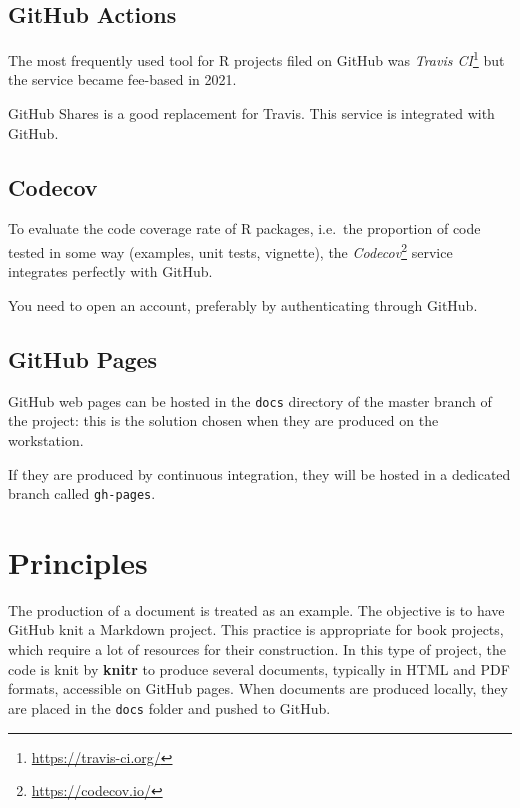 \documentclass[
  12pt,
  american,
  a4paper,
  extrafontsizes,onecolumn,openright
  ]{memoir}
\newlength{\rf}
\begin{document}
\hypertarget{github-actions}{%
\subsection{GitHub Actions}\label{github-actions}}

The most frequently used tool for R projects filed on GitHub was \emph{Travis CI}\footnote{\url{https://travis-ci.org/}} but the service became fee-based in 2021.

GitHub Shares is a good replacement for Travis.
This service is integrated with GitHub.

\hypertarget{codecov}{%
\subsection{Codecov}\label{codecov}}

To evaluate the code coverage rate of R packages, i.e.~the proportion of code tested in some way (examples, unit tests, vignette), the \emph{Codecov}\footnote{\url{https://codecov.io/}} service integrates perfectly with GitHub.

You need to open an account, preferably by authenticating through GitHub.

\hypertarget{github-pages}{%
\subsection{GitHub Pages}\label{github-pages}}

GitHub web pages can be hosted in the \texttt{docs} directory of the master branch of the project: this is the solution chosen when they are produced on the workstation.

If they are produced by continuous integration, they will be hosted in a dedicated branch called \texttt{gh-pages}.

\hypertarget{principles}{%
\section{Principles}\label{principles}}

The production of a document is treated as an example.
The objective is to have GitHub knit a Markdown project.
This practice is appropriate for book projects, which require a lot of resources for their construction.
In this type of project, the code is knit by \textbf{knitr} to produce several documents, typically in HTML and PDF formats, accessible on GitHub pages.
When documents are produced locally, they are placed in the \texttt{docs} folder and pushed to GitHub.
\end{document}
